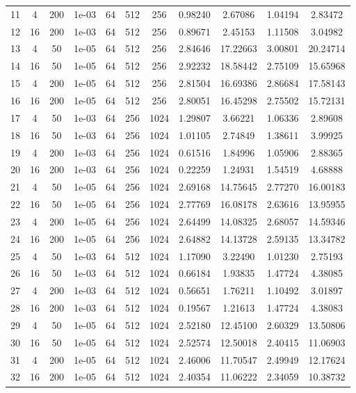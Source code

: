 \documentclass{automatextcc}
\begin{document}
\begin{table}
{\begin{tabular}[t]{ccccccccccc}
            11 & 4 & 200 & 1e-03 & 64 & 512 & 256 & 0.98240 & 2.67086 & 1.04194 & 2.83472 \\
            12 & 16 & 200 & 1e-03 & 64 & 512 & 256 & 0.89671 & 2.45153 & 1.11508 & 3.04982 \\
            13 & 4 & 50 & 1e-05 & 64 & 512 & 256 & 2.84646 & 17.22663 & 3.00801 & 20.24714 \\
            14 & 16 & 50 & 1e-05 & 64 & 512 & 256 & 2.92232 & 18.58442 & 2.75109 & 15.65968 \\
            15 & 4 & 200 & 1e-05 & 64 & 512 & 256 & 2.81504 & 16.69386 & 2.86684 & 17.58143 \\
            16 & 16 & 200 & 1e-05 & 64 & 512 & 256 & 2.80051 & 16.45298 & 2.75502 & 15.72131 \\
            17 & 4 & 50 & 1e-03 & 64 & 256 & 1024 & 1.29807 & 3.66221 & 1.06336 & 2.89608 \\
            18 & 16 & 50 & 1e-03 & 64 & 256 & 1024 & 1.01105 & 2.74849 & 1.38611 & 3.99925 \\
            19 & 4 & 200 & 1e-03 & 64 & 256 & 1024 & 0.61516 & 1.84996 & 1.05906 & 2.88365 \\
            20 & 16 & 200 & 1e-03 & 64 & 256 & 1024 & 0.22259 & 1.24931 & 1.54519 & 4.68888 \\
            21 & 4 & 50 & 1e-05 & 64 & 256 & 1024 & 2.69168 & 14.75645 & 2.77270 & 16.00183 \\
            22 & 16 & 50 & 1e-05 & 64 & 256 & 1024 & 2.77769 & 16.08178 & 2.63616 & 13.95955 \\
            23 & 4 & 200 & 1e-05 & 64 & 256 & 1024 & 2.64499 & 14.08325 & 2.68057 & 14.59346 \\
            24 & 16 & 200 & 1e-05 & 64 & 256 & 1024 & 2.64882 & 14.13728 & 2.59135 & 13.34782 \\
            25 & 4 & 50 & 1e-03 & 64 & 512 & 1024 & 1.17090 & 3.22490 & 1.01230 & 2.75193 \\
            26 & 16 & 50 & 1e-03 & 64 & 512 & 1024 & 0.66184 & 1.93835 & 1.47724 & 4.38085 \\
            27 & 4 & 200 & 1e-03 & 64 & 512 & 1024 & 0.56651 & 1.76211 & 1.10492 & 3.01897 \\
            28 & 16 & 200 & 1e-03 & 64 & 512 & 1024 & 0.19567 & 1.21613 & 1.47724 & 4.38083 \\
            29 & 4 & 50 & 1e-05 & 64 & 512 & 1024 & 2.52180 & 12.45100 & 2.60329 & 13.50806 \\
            30 & 16 & 50 & 1e-05 & 64 & 512 & 1024 & 2.52574 & 12.50018 & 2.40415 & 11.06903 \\
            31 & 4 & 200 & 1e-05 & 64 & 512 & 1024 & 2.46006 & 11.70547 & 2.49949 & 12.17624 \\
            32 & 16 & 200 & 1e-05 & 64 & 512 & 1024 & 2.40354 & 11.06222 & 2.34059 & 10.38732 \\
            \bottomrule
        \end{tabular}
    }
\end{table}
\end{document}
